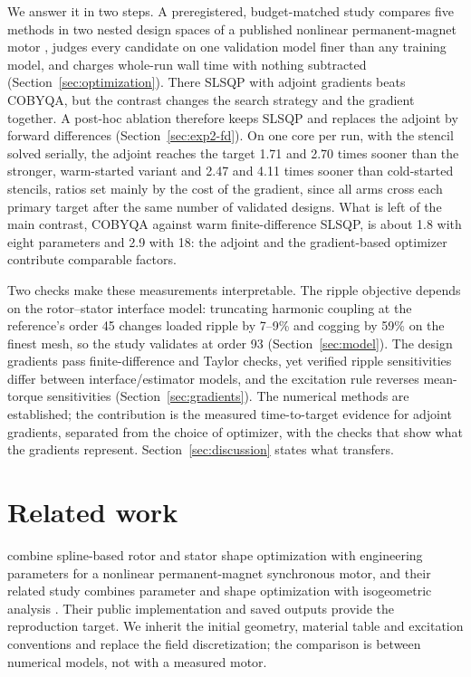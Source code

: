 \documentclass{anvil-paper}
\begin{document}
We answer it in two steps. A preregistered, budget-matched study compares
five methods in two nested design spaces of a published nonlinear
permanent-magnet motor \citep{wiesheu2024spline}, judges every candidate
on one validation model finer than any training model, and charges
whole-run wall time with nothing subtracted (Section~\ref{sec:optimization}).
There SLSQP with adjoint gradients beats COBYQA, but the contrast changes
the search strategy and the gradient together. A post-hoc ablation
therefore keeps SLSQP and replaces the adjoint by forward differences
(Section~\ref{sec:exp2-fd}). On one core per run, with the stencil solved
serially, the adjoint reaches the target 1.71 and 2.70 times sooner than
the stronger, warm-started variant and 2.47 and 4.11 times sooner than
cold-started stencils, ratios set mainly by the cost of the gradient, since
all arms cross each primary target after the same number of validated
designs.
What is left of the main contrast, COBYQA against warm finite-difference
SLSQP, is about 1.8 with eight parameters and 2.9 with 18: the adjoint and
the gradient-based optimizer contribute comparable factors.

Two checks make these measurements interpretable. The ripple objective
depends on the rotor--stator interface model: truncating harmonic coupling
at the reference's order 45 changes loaded ripple by 7--9\% and cogging by
59\% on the finest mesh, so the study validates at order 93
(Section~\ref{sec:model}). The design gradients pass finite-difference and
Taylor checks, yet verified ripple sensitivities differ between
interface/estimator models, and the excitation rule reverses mean-torque
sensitivities (Section~\ref{sec:gradients}). The numerical methods are
established; the contribution is the measured time-to-target evidence for
adjoint gradients, separated from the choice of optimizer, with the checks
that show what the gradients represent. Section~\ref{sec:discussion} states
what transfers.

\section{Related work}
\citet{wiesheu2024spline} combine spline-based rotor and stator shape
optimization with engineering parameters for a nonlinear permanent-magnet
synchronous motor, and their related study combines parameter and shape
optimization with isogeometric analysis \citep{wiesheu2025combined}. Their
public implementation and saved outputs provide the reproduction target.
We inherit the initial geometry, material table and excitation
conventions and replace the field discretization; the comparison is
between numerical models, not with a measured motor.
\end{document}
